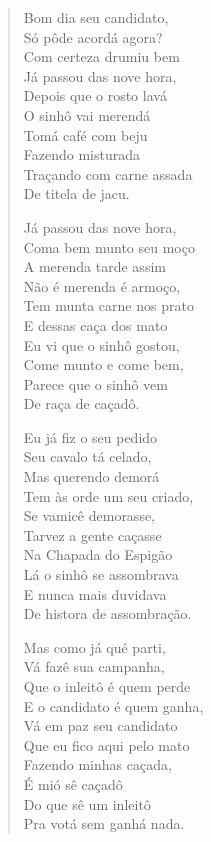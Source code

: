 \begin{verse}
Bom dia seu candidato,\\
Só pôde acordá agora?\\
Com certeza drumiu bem\\
Já passou das nove hora,\\
Depois que o rosto lavá\\
O sinhô vai merendá\\
Tomá café com beju\\
Fazendo misturada\\
Traçando com carne assada\\
De titela de jacu.

Já passou das nove hora,\\
Coma bem munto seu moço\\
A merenda tarde assim\\
Não é merenda é armoço,\\
Tem munta carne nos prato\\
E dessas caça dos mato\\
Eu vi que o sinhô gostou,\\
Come munto e come bem,\\
Parece que o sinhô vem\\
De raça de caçadô.

Eu já fiz o seu pedido\\
Seu cavalo tá celado,\\
Mas querendo demorá\\
Tem às orde um seu criado,\\
Se vamicê demorasse,\\
Tarvez a gente caçasse\\
Na Chapada do Espigão\\
Lá o sinhô se assombrava\\
E nunca mais duvidava\\
De histora de assombração.

Mas como já qué parti,\\
Vá fazê sua campanha,\\
Que o inleitô é quem perde\\
E o candidato é quem ganha,\\
Vá em paz seu candidato\\
Que eu fico aqui pelo mato\\
Fazendo minhas caçada,\\
É mió sê caçadô\\
Do que sê um inleitô\\
Pra votá sem ganhá nada.
\end{verse}


